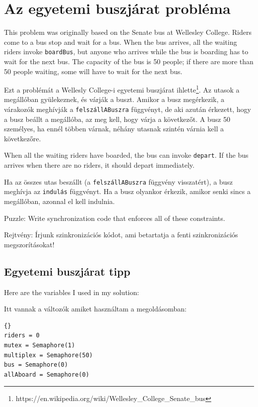 \documentclass{book}
\newcommand{\clearemptydoublepage}{\newpage\cleardoublepage}
\begin{document}
\clearemptydoublepage
\section{Az egyetemi buszjárat probléma}

This problem was originally based on the Senate bus at Wellesley
College.  Riders come to a bus stop and wait for a bus.  When the bus
arrives, all the waiting riders invoke {\tt boardBus}, but anyone who
arrives while the bus is boarding has to wait for the next bus.  The
capacity of the bus is 50 people; if there are more than 50 people
waiting, some will have to wait for the next bus.

Ezt a problémát a Wellesly College-i egyetemi buszjárat
ihlette\footnote{https://en.wikipedia.org/wiki/Wellesley\_College\_Senate\_bus}.
Az utasok a megállóban gyülekeznek, és várják a buszt.
Amikor a busz megérkezik, a várakozók meghívják a
{\tt felszállABuszra} függvényt, de aki azután érkezett,
hogy a busz beállt a megállóba, az meg kell, hogy várja
a következőt. A busz 50 személyes, ha ennél többen várnak,
néhány utasnak szintén várnia kell a következőre.

When all the waiting riders have boarded,
the bus can invoke {\tt depart}.  If the bus arrives when there
are no riders, it should depart immediately.

Ha az összes utas beszállt (a {\tt felszállABuszra} függvény visszatért),
a busz meghívja az {\tt indulás} függvényt. Ha a busz olyankor
érkezik, amikor senki sincs a megállóban, azonnal el kell
indulnia.

Puzzle: Write synchronization code that enforces all of these
constraints.

Rejtvény: Írjunk szinkronizációs kódot, ami betartatja a
fenti szinkronizációs megszorításokat!

\clearemptydoublepage
\subsection{Egyetemi buszjárat tipp}

Here are the variables I used in my solution:

Itt vannak a változók amiket használtam a
megoldásomban:

\begin{lstlisting}[title={Bus problem hint}]{}
riders = 0
mutex = Semaphore(1)
multiplex = Semaphore(50)
bus = Semaphore(0)
allAboard = Semaphore(0)
\end{lstlisting}
\end{document}
